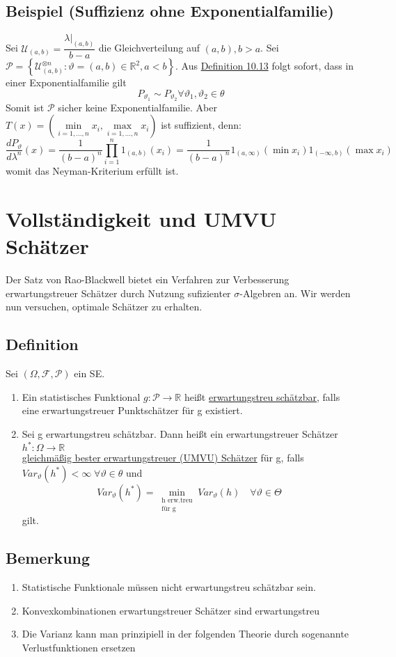 \documentclass[german,10pt,oneside, fleqn, a4paper]{article}
\newcommand {\R}	{\mathbb{R}}
\newcommand{\ra}{\rightarrow}
\newcommand{\brc}[1]{\left(#1\right)}
\newcommand{\brac}[1]{\left\lbrace #1\right\rbrace}
\newcommand{\mc}[1]{\mathcal{#1}}
\newcommand{\1}[1]{1_{#1}}
\newcommand{\2}[1]{\1{\brac{#1}}}
\newcommand{\f}{\mc{F}}
\newcommand{\p}{\mc{P}}
\newcommand{\stuff}{{\otimes n}}
\begin{document}
\subsection{Beispiel (Suffizienz ohne Exponentialfamilie)}
\label{10.16} 
Sei $\mc{U}_{(a,b)}=\dfrac{\lambda\vert_{(a,b)}}{b-a}$ die Gleichverteilung auf $(a,b), b>a$. Sei \\
$\mc{P}=\brac{\mc{U}_{(a,b)}^\stuff:\vartheta=(a,b)\in\R^2, a<b}$. Aus \hyperref[10.13]{Definition 10.13} folgt sofort, dass in einer Exponentialfamilie gilt\[
P_{\vartheta_1}\sim P_{\vartheta_2}\forall\vartheta_1,\vartheta_2\in\theta\]
Somit ist $\mc{P}$ sicher keine Exponentialfamilie. Aber $T(x)=\brc{\min\limits_{i=1,...,n}x_i,\max\limits_{i=1,...,n}x_i}$ ist suffizient, denn:\[
\dfrac{dP_\vartheta}{d\lambda^n}(x)=\dfrac{1}{(b-a)^n}\prod\limits_{i=1}^n1_{(a,b)}(x_i)=\dfrac{1}{(b-a)^n}1_{(a,\infty)}(\min x_i)1_{(-\infty,b)}(\max x_i)
\]
womit das Neyman-Kriterium erfüllt ist.

\section{Vollständigkeit und UMVU Schätzer}
Der Satz von Rao-Blackwell bietet ein Verfahren zur Verbesserung erwartungstreuer Schätzer durch Nutzung sufizienter $\sigma$-Algebren an. Wir werden nun versuchen, optimale Schätzer zu erhalten.

\subsection{Definition}
\label{11.1}
Sei $(\Omega,\f,\p)$ ein SE.\begin{enumerate}[label=(\alph*)]
\item Ein statistisches Funktional $g:\mc{P}\ra\R$ heißt \underline{erwartungstreu schätzbar}, falls eine erwartungstreuer Punktschätzer für g existiert.
\item Sei g erwartungstreu schätzbar. Dann heißt ein erwartungstreuer Schätzer $h^*:\Omega\ra\R$\\
\underline{gleichmäßig bester erwartungstreuer (UMVU) Schätzer} für g, falls $Var_\vartheta(h^*)<\infty\;\forall\vartheta\in\theta$ und\[
Var_{\vartheta}(h^*)=\min\limits_{\substack{\text{h erw.treu}\\\text{für g}}}Var_\vartheta(h)\quad\forall\vartheta\in\Theta\] gilt.
\end{enumerate}

\subsection{Bemerkung}
\begin{enumerate}[label=(\roman*)]
\item Statistische Funktionale müssen nicht erwartungstreu schätzbar sein.
\item Konvexkombinationen erwartungstreuer Schätzer sind erwartungstreu
\item Die Varianz kann man prinzipiell in der folgenden Theorie durch sogenannte Verlustfunktionen ersetzen
\end{enumerate}
\end{document}
